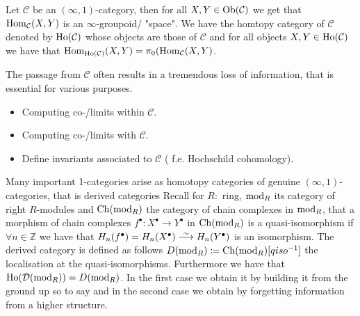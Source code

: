 \begin{rmk}
    Let $ \mathcal{ C } $ be an $ ( \infty , 1 ) $-category, then for all $ X , Y \in \operatorname{Ob} ( \mathcal{ C } ) $ we get that $ \operatorname{Hom}_{ \mathcal{ C } } ( X , Y )$ is an $\infty$-groupoid/ "space".
    We have the homtopy category of $ \mathcal{ C } $ denoted by $ \operatorname{Ho} ( \mathcal{ C } )$ whose objects are those of $ \mathcal{ C } $ and for all objects $ X , Y \in \operatorname{Ho} ( \mathcal{ C } ) $ we have that $ \operatorname{Hom}_{ \operatorname{Ho} ( \mathcal{ C } ) } ( X , Y ) = \pi_0 ( \operatorname{Hom}_{ \mathcal{ C } } ( X , Y ) $.
\end{rmk}

\begin{Warning}
    The passage from $ \mathcal{ C } $ often results in a tremendous loss of information, that is essential for various purposes.
    \begin{itemize}
        \item 
        Computing co-/limits within $ \mathcal{ C } $.

        \item 
        Computing co-/limits with $ \mathcal{ C } $.

        \item 
        Define invariants associated to $ \mathcal{ C } $ ( f.e. Hochschild cohomology).
    \end{itemize}
\end{Warning}


\begin{rmd}
    Many important 1-categories arise as homotopy categories of genuine $ ( \infty , 1 ) $-categories, that is derived categories
    Recall for $ R \colon $ ring, $ \operatorname{mod}_R $ its category of right $ R $-modules and $ \operatorname{Ch} ( \operatorname{mod}_R ) $ the category of chain complexes in $ \operatorname{mod}_R $, that a morphism of chain complexes $ f^\bullet \colon X^\bullet \to Y^\bullet $ in $ \operatorname{Ch} ( \operatorname{mod}_R ) $ is a quasi-isomorphism if $ \forall n \in \mathbb{ Z } $ we have that $ H_n ( f^\bullet ) = H_n ( X^\bullet ) \isomorphism H_n ( Y^\bullet ) $ is an isomorphism.
    The derived category is defined as follows $ D ( \operatorname{mod}_R ) \coloneqq \operatorname{Ch} ( \operatorname{mod}_R ) [qiso^{-1}] $ the localisation at the quasi-isomorphisms.
    Furthermore we have that $ \operatorname{Ho} ( \mathcal{ D } ( \operatorname{mod}_R ) ) = D ( \operatorname{mod}_R) $.
    In the first case we obtain it by building it from the ground up so to say and in the second case we obtain by forgetting information from a higher structure.
\end{rmd}

